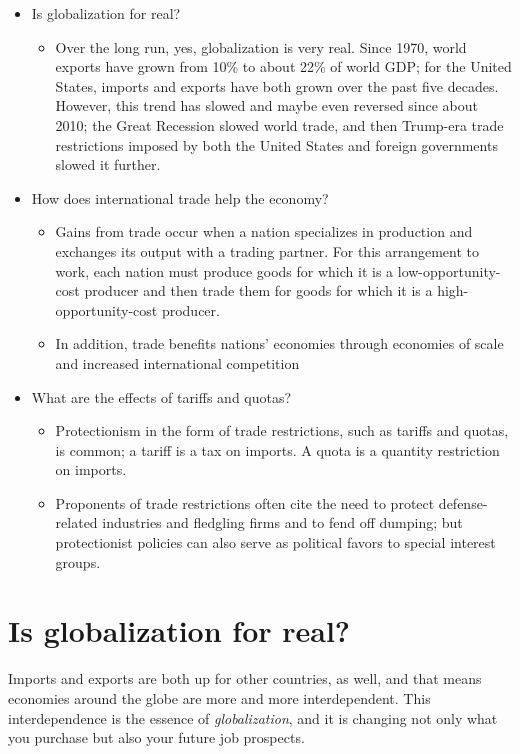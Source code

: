 \documentclass[11pt]{article} %
\begin{document}
\begin{tcolorbox}[width=\textwidth,colback={white},title={Big Questions},colbacktitle=yellow,coltitle=blue]
\begin{itemize}
\item Is globalization for real?
\begin{itemize}
\item Over the long run, yes, globalization is very real. Since 1970, world exports have grown from 10\% to about 22\% of world GDP; for the United States, imports and exports have both grown over the past five decades. However, this trend has slowed and maybe even reversed since about 2010; the Great Recession slowed world trade, and then Trump-era trade restrictions imposed by both the United States and foreign governments slowed it further.
\end{itemize}
\item How does international trade help the economy?
\begin{itemize}
\item Gains from trade occur when a nation specializes in production and exchanges its output with a trading partner. For this arrangement to work, each nation must produce goods for which it is a low-opportunity-cost producer and then trade them for goods for which it is a high-opportunity-cost producer.
\item In addition, trade benefits nations' economies through economies of scale and increased international competition 
\end{itemize}
\item What are the effects of tariffs and quotas?
\begin{itemize}
\item Protectionism in the form of trade restrictions, such as tariffs and quotas, is common; a tariff is a tax on imports. A quota is a quantity restriction on imports.
\item Proponents of trade restrictions often cite the need to protect defense-related industries and fledgling firms and to fend off dumping; but protectionist policies can also serve as political favors to special interest groups.
\end{itemize}
\end{itemize}
\end{tcolorbox}

\section*{\textbf{Is globalization for real?}}
Imports and exports are both up for other countries, as well, and that means economies around the globe are more and more interdependent. This interdependence is the essence of \textit{globalization}, and it is changing not only what you purchase but also your future job prospects.
\end{document}
